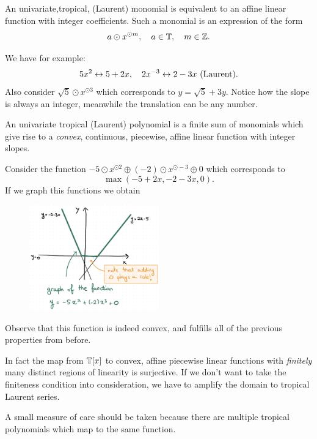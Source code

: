 \documentclass[12pt]{memoir}
\begin{document}
An univariate,tropical, (Laurent) monomial is equivalent to an affine linear function with integer coefficients. Such a monomial is an expression of the form 
$$a\odot x^{\odot m},\quad a\in\mathbb{T},\quad m\in\mathbb{Z}.$$

\begin{Ex}
    We have for example:
    $$5x^2\leftrightarrow 5+2x,\quad 2x^{-3}\leftrightarrow 2-3x\ (\text{Laurent}).$$
    Also consider $\sqrt 5\odot x^{\odot 3}$ which corresponds to $y=\sqrt{5}+3y$. Notice how the slope is always an integer, meanwhile the translation can be any number.
\end{Ex}

An univariate tropical (Laurent) polynomial is a finite sum of monomials which give rise to a \emph{convex}, continuous, piecewise, affine linear function with integer slopes. 

\begin{Ex}
    Consider the function $-5\odot x^{\odot2}\oplus(-2)\odot x^{\odot-3}\oplus 0$ which corresponds to 
    $$\max(-5+2x,-2-3x,0).$$
    If we graph this functions we obtain
    \begin{figure}[h!]
        \centering
        \includegraphics[width=0.5\textwidth]{figs/fig3.1RenzoNotes3.png}
        \label{fig:3.1-ConvPLFunc}
    \end{figure}
    Observe that this function is indeed convex, and fulfills all of the previous properties from before. 
\end{Ex}

In fact the map from $\mathbb{T}[x]$ to convex, affine piecewise linear functions with \emph{finitely} many distinct regions of linearity is surjective. If we don't want to take the finiteness condition into consideration, we have to amplify the domain to tropical Laurent series.\par 
A small measure of care should be taken because there are multiple tropical polynomials which map to the same function.
\end{document}
